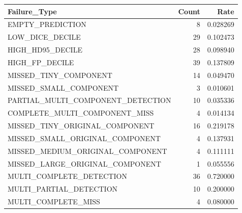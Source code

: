 \begin{tabular}{lrr}
\toprule
Failure_Type & Count & Rate \\
\midrule
EMPTY_PREDICTION & 8 & 0.028269 \\
LOW_DICE_DECILE & 29 & 0.102473 \\
HIGH_HD95_DECILE & 28 & 0.098940 \\
HIGH_FP_DECILE & 39 & 0.137809 \\
MISSED_TINY_COMPONENT & 14 & 0.049470 \\
MISSED_SMALL_COMPONENT & 3 & 0.010601 \\
PARTIAL_MULTI_COMPONENT_DETECTION & 10 & 0.035336 \\
COMPLETE_MULTI_COMPONENT_MISS & 4 & 0.014134 \\
MISSED_TINY_ORIGINAL_COMPONENT & 16 & 0.219178 \\
MISSED_SMALL_ORIGINAL_COMPONENT & 4 & 0.137931 \\
MISSED_MEDIUM_ORIGINAL_COMPONENT & 4 & 0.111111 \\
MISSED_LARGE_ORIGINAL_COMPONENT & 1 & 0.055556 \\
MULTI_COMPLETE_DETECTION & 36 & 0.720000 \\
MULTI_PARTIAL_DETECTION & 10 & 0.200000 \\
MULTI_COMPLETE_MISS & 4 & 0.080000 \\
\bottomrule
\end{tabular}
